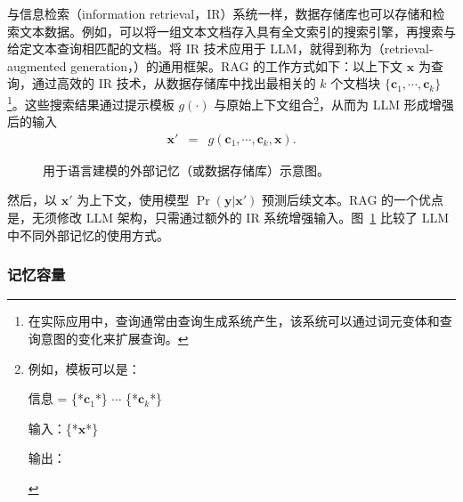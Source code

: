 与信息检索（information retrieval，IR）系统一样，数据存储库也可以存储和检索文本数据。例如，可以将一组文本文档存入具有全文索引的搜索引擎，再搜索与给定文本查询相匹配的文档。将 IR 技术应用于 LLM，就得到称为（retrieval-augmented generation，）的通用框架。RAG 的工作方式如下：以上下文 $\mathbf{x}$ 为查询，通过高效的 IR 技术，从数据存储库中找出最相关的 $k$ 个文档块 $\{\mathbf{c}_{1},\cdots,\mathbf{c}_{k}\}$\footnote{在实际应用中，查询通常由查询生成系统产生，该系统可以通过词元变体和查询意图的变化来扩展查询。}。这些搜索结果通过提示模板 $g(\cdot)$ 与原始上下文组合\footnote{例如，模板可以是：

\vspace{0.3em}
\begin{tcolorbox}
\begin{center}
\parbox{0.9\textwidth}
{

\hspace{4em} 信息 = \{*$\mathbf{c}_1$*\} $\cdots$ \{*$\mathbf{c}_k$*\}

\vspace{0.3em}

\hspace{4em} 输入：\{*$\mathbf{x}$*\}

\vspace{0.3em}

\hspace{4em} 输出：\underline{\hspace{2em}}

}
\end{center}
\end{tcolorbox}

}，从而为 LLM 形成增强后的输入
\begin{eqnarray}
\mathbf{x}' & = & g(\mathbf{c}_{1},\cdots,\mathbf{c}_{k},\mathbf{x}).
\end{eqnarray}

\begin{figure}[!t]
\centering

\caption{用于语言建模的外部记忆（或数据存储库）示意图。}
\label{fig:comparison-external-memories}
\end{figure}

\noindent 然后，以 $\mathbf{x}'$ 为上下文，使用模型 $\Pr(\mathbf{y}|\mathbf{x}')$ 预测后续文本。RAG 的一个优点是，无须修改 LLM 架构，只需通过额外的 IR 系统增强输入。图~\ref{fig:comparison-external-memories} 比较了 LLM 中不同外部记忆的使用方式。

\subsubsection{记忆容量}

